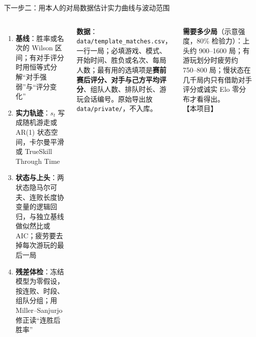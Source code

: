 \documentclass[aspectratio=169,11pt]{beamer}
\newcommand{\evtag}[2]{\mbox{\textcolor{#1}{\scriptsize【#2】}}}
\newcommand{\tagOwn}{\evtag{cRed}{本项目}}
\newcommand{\looselist}{\setlength{\itemsep}{4pt}\setlength{\parskip}{0pt}}
\begin{document}
\begin{frame}{下一步二：用本人的对局数据估计实力曲线与波动范围}
\begin{columns}[T,onlytextwidth]
\small
\begin{enumerate}\looselist
  \item \textbf{基线}：胜率或名次的 Wilson 区间；有对手评分时用恒等式分解“对手强弱”与“评分变化”
  \item \textbf{实力轨迹}：$s_t$ 写成随机游走或 AR(1) 状态空间，卡尔曼平滑或 TrueSkill Through Time
  \item \textbf{状态与上头}：两状态隐马尔可夫、连败长度协变量的逻辑回归，与独立基线做似然比或 AIC；疲劳要去掉每次游玩的最后一局
  \item \textbf{残差体检}：冻结模型为零假设，按连败、时段、组队分组；用 Miller–Sanjurjo 修正读“连胜后胜率”
\end{enumerate}
\begin{notebox}
\footnotesize\textbf{数据}：\texttt{data/template\_matches.csv}，一行一局；必填游戏、模式、开始时间、胜负或名次、每局人数；最有用的选填项是\textbf{赛前赛后评分、对手与己方平均评分}、组队人数、排队时长、游玩会话编号。原始导出放 \texttt{data/private/}，不入库。
\end{notebox}
\begin{notebox}[cYellow]
\footnotesize\textbf{需要多少局}（示意强度，80\% 检验力）：上头约 900–1600 局；有游玩划分时疲劳约 750–800 局；慢状态在几千局内只有借助对手评分或诚实 Elo 零分布才看得出。\tagOwn
\end{notebox}
\end{columns}
\end{frame}
\end{document}
